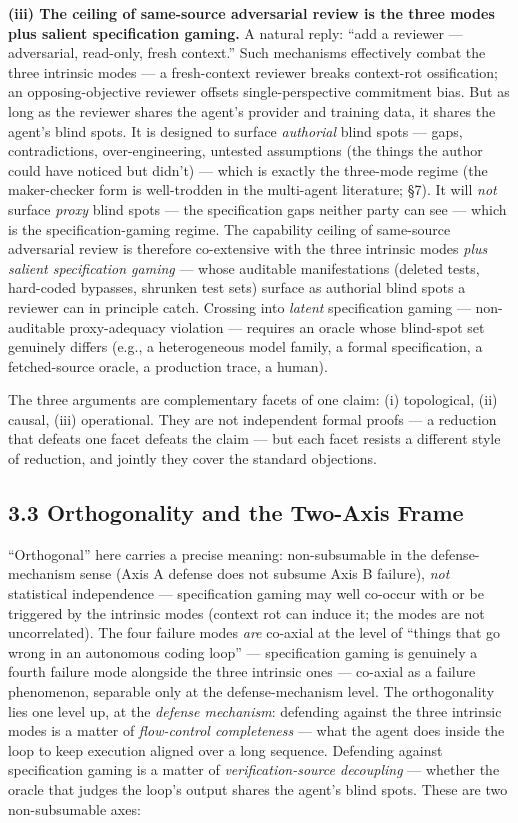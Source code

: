\documentclass[
  11pt,
]{article}
\begin{document}
\textbf{(iii) The ceiling of same-source adversarial review is the three
modes plus salient specification gaming.} A natural reply: ``add a
reviewer --- adversarial, read-only, fresh context.'' Such mechanisms
effectively combat the three intrinsic modes --- a fresh-context
reviewer breaks context-rot ossification; an opposing-objective reviewer
offsets single-perspective commitment bias. But as long as the reviewer
shares the agent's provider and training data, it shares the agent's
blind spots. It is designed to surface \emph{authorial} blind spots ---
gaps, contradictions, over-engineering, untested assumptions (the things
the author could have noticed but didn't) --- which is exactly the
three-mode regime (the maker-checker form is well-trodden in the
multi-agent literature; §7). It will \emph{not} surface \emph{proxy}
blind spots --- the specification gaps neither party can see --- which
is the specification-gaming regime. The capability ceiling of
same-source adversarial review is therefore co-extensive with the three
intrinsic modes \emph{plus salient specification gaming} --- whose
auditable manifestations (deleted tests, hard-coded bypasses, shrunken
test sets) surface as authorial blind spots a reviewer can in principle
catch. Crossing into \emph{latent} specification gaming ---
non-auditable proxy-adequacy violation --- requires an oracle whose
blind-spot set genuinely differs (e.g., a heterogeneous model family, a
formal specification, a fetched-source oracle, a production trace, a
human).

The three arguments are complementary facets of one claim: (i)
topological, (ii) causal, (iii) operational. They are not independent
formal proofs --- a reduction that defeats one facet defeats the claim
--- but each facet resists a different style of reduction, and jointly
they cover the standard objections.

\subsection{3.3 Orthogonality and the Two-Axis
Frame}\label{orthogonality-and-the-two-axis-frame}

``Orthogonal'' here carries a precise meaning: non-subsumable in the
defense-mechanism sense (Axis A defense does not subsume Axis B
failure), \emph{not} statistical independence --- specification gaming
may well co-occur with or be triggered by the intrinsic modes (context
rot can induce it; the modes are not uncorrelated). The four failure
modes \emph{are} co-axial at the level of ``things that go wrong in an
autonomous coding loop'' --- specification gaming is genuinely a fourth
failure mode alongside the three intrinsic ones --- co-axial as a
failure phenomenon, separable only at the defense-mechanism level. The
orthogonality lies one level up, at the \emph{defense mechanism}:
defending against the three intrinsic modes is a matter of
\emph{flow-control completeness} --- what the agent does inside the loop
to keep execution aligned over a long sequence. Defending against
specification gaming is a matter of \emph{verification-source
decoupling} --- whether the oracle that judges the loop's output shares
the agent's blind spots. These are two non-subsumable axes:
\end{document}
